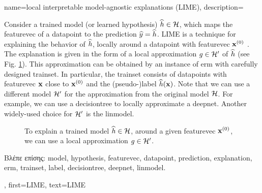 {name={local interpretable model-agnostic explanations (LIME)},
	description={Consider 
		a trained \gls{model} (or learned \gls{hypothesis}) $\widehat{h} \in \mathcal{H}$, 
		which maps the \gls{featurevec} of a \gls{datapoint} to the \gls{prediction} $\widehat{y}= \widehat{h}$. 
		LIME is a technique for explaining 
		the behavior of $\widehat{h}$, locally around a \gls{datapoint} with \gls{featurevec} ${\bf x}^{(0)}$ \cite{Ribeiro2016}. 
		The \gls{explanation} is given in the form of a local approximation $g \in \mathcal{H}'$ of $\widehat{h}$ (see Fig. \ref{fig_lime_dict}). 
		This approximation can be obtained by an instance of \gls{erm} with carefully designed 
		\gls{trainset}. In particular, the \gls{trainset} consists of \gls{datapoint}s with 
		\gls{featurevec} ${\bf x}$ close to ${\bf x}^{(0)}$ and the (pseudo-)\gls{label} $\widehat{h}({\bf x})$. 
		Note that we can use a different \gls{model} $\mathcal{H}'$ for the approximation from 
		the original \gls{model} $\mathcal{H}$. For example, we can use a \gls{decisiontree} 
		to locally approximate a \gls{deepnet}. Another widely-used choice for $\mathcal{H}'$ is 
		the \gls{linmodel}. 
		\begin{figure}[H]
		\begin{center}
		\end{center}
		\caption{To explain a trained \gls{model} $\widehat{h} \in \mathcal{H}$, around a 
		given \gls{featurevec} ${\bf x}^{(0)}$, we can use a local approximation $g \in \mathcal{H}'$. }
		\label{fig_lime_dict}
		\end{figure}
		\foreignlanguage{greek}{Βλέπε επίσης:} \gls{model}, \gls{hypothesis}, \gls{featurevec}, \gls{datapoint}, \gls{prediction}, 
		\gls{explanation}, \gls{erm}, \gls{trainset}, \gls{label}, \gls{decisiontree}, \gls{deepnet}, \gls{linmodel}.},
	first={LIME},
	text={LIME}
}
	

